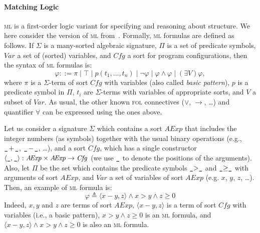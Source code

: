 \documentclass[conference]{IEEEtran}
\newenvironment{todo}{\medskip\hrule\smallskip\noindent}{\smallskip\hrule\medskip}
\newcommand{\dl}[1]{\begin{todo}\textcolor{blue}{Dorel:}\\ \color{red}{#1}\color{black}\end{todo}}
\newcommand{\dl}[1]{}
\newcommand{\Cfg}{\mathit{Cfg}}
\newcommand{\True}{\top}
\newcommand{\eqbydef}{\triangleq}
\newcommand{\Var}{\mathit{Var}}
\renewcommand{\implies}{\rightarrow}
\newcommand{\ML}{\textsc{ml}\xspace}
\newcommand{\FOL}{\textsc{fol}\xspace}
\begin{document}
\paragraph{Matching Logic}
\ML is a first-order logic variant for specifying and reasoning about structure.
We here consider the version of \ML from~\cite{rosu-2015-rta}.
Formally, \ML formulas are defined as follows.
If $\Sigma$ is a many-sorted algebraic signature, $\Pi$ is a set of predicate symbols, $\Var$ a set of (sorted) variables, and $\Cfg$ a sort for program configurations, then the syntax of \ML formulas is:
$$\varphi ::= \pi \mid \True\mid p(t_1,\ldots,t_n) \mid  \neg \varphi\mid \varphi\land\varphi\mid (\exists V) \varphi,$$
where $\pi$ is a $\Sigma$-term of sort $\Cfg$ with variables (also called \emph{basic pattern}), $p$ is a predicate symbol in $\Pi$, $t_i$ are $\Sigma$-terms with variables of appropriate sorts, and $V$ a subset of $\Var$.
As usual, the other known \FOL connectives ($\lor$, $\implies$, \ldots) and quantifier $\forall$ can be expressed using the ones above.

Let us consider a signature $\Sigma$ which contains
a sort $\mathit{A\!Exp}$ that includes the integer numbers (as symbols) together with the usual binary operations (e.g., $\mathrel{\text{\ttfamily \_}}\!+\!\mathrel{\text{\ttfamily \_}}$, $\mathrel{\text{\ttfamily \_}}\!-\!\mathrel{\text{\ttfamily \_}}$,  \ldots), 
and a sort $\Cfg$, which has a single constructor $\langle\terminal{\_},\terminal{\_}\rangle : \mathit{A\!Exp} \times \mathit{A\!Exp} \to \Cfg$  (we use $\mathrel{\text{\ttfamily \_}}$ to denote the positions of the arguments).
Also, let $\Pi$ be the set which contains the predicate symbols $\mathrel{\text{\ttfamily \_}}>\mathrel{\text{\ttfamily \_}}$ and $\mathrel{\text{\ttfamily \_}}\geq\mathrel{\text{\ttfamily \_}}$ with arguments of sort $\mathit{A\!Exp}$, and $\Var$ a set of variables of sort $\mathit{A\!Exp}$ (e.g. $x$, $y$, $z$, \ldots).
Then, an example of \ML formula is:
$$\varphi \eqbydef \langle x - y, z \rangle \land x > y \land z \geq 0$$
\noindent
Indeed, $x,  y$ and $z$ are terms of sort $\mathit{A\!Exp}$, $\langle x - y, z \rangle$ is a term of sort $\Cfg$ with variables (i.e., a basic pattern), $x > y \land z \geq 0$ is an \ML formula, and $\langle x - y, z \rangle \land x > y \land z \geq 0$ is also an \ML formula.
\end{document}
